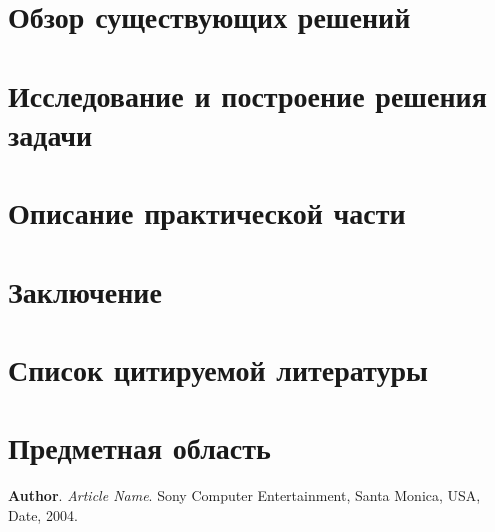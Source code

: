 \documentclass[11pt,a4paper]{extarticle}
\begin{document}
\section{Обзор существующих решений}

\section{Исследование и построение решения задачи}

\section{Описание практической части}

\section{Заключение}

\section{Список цитируемой литературы}

\section{Предметная область}

\begin{thebibliography}{00}

	\textbf{Author}.
	\emph{Article Name}.
	Sony Computer Entertainment, Santa Monica, USA,
	Date, 2004.


\end{thebibliography}
\end{document}
